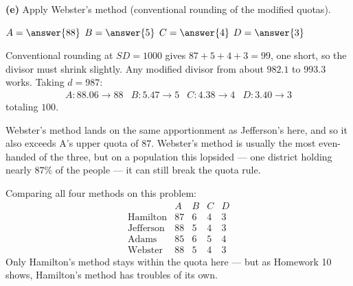 \documentclass[12pt]{ximera}
\begin{document}
\begin{problem}
\begin{prompt}
\textbf{(e)} Apply Webster's method (conventional rounding of the modified quotas).

$A = \answer{88}$ \quad $B = \answer{5}$ \quad $C = \answer{4}$ \quad $D = \answer{3}$

\begin{feedback}
Conventional rounding at $SD = 1000$ gives $87+5+4+3 = 99$, one short, so the divisor
must shrink slightly. Any modified divisor from about $982.1$ to $993.3$ works. Taking
$d = 987$:
\[
\begin{array}{llll}
A: 88.06 \to 88 & B: 5.47 \to 5 & C: 4.38 \to 4 & D: 3.40 \to 3
\end{array}
\]
totaling $100$. \checkmark

Webster's method lands on the same apportionment as Jefferson's here, and so it also
exceeds A's upper quota of $87$. Webster's method is usually the most even-handed of
the three, but on a population this lopsided --- one district holding nearly $87\%$ of
the people --- it can still break the quota rule.

Comparing all four methods on this problem:
\[
\begin{array}{lcccc}
 & A & B & C & D\\
\text{Hamilton} & 87 & 6 & 4 & 3\\
\text{Jefferson} & 88 & 5 & 4 & 3\\
\text{Adams} & 85 & 6 & 5 & 4\\
\text{Webster} & 88 & 5 & 4 & 3
\end{array}
\]
Only Hamilton's method stays within the quota here --- but as Homework 10 shows,
Hamilton's method has troubles of its own.
\end{feedback}
\end{prompt}
\end{problem}
\end{document}
